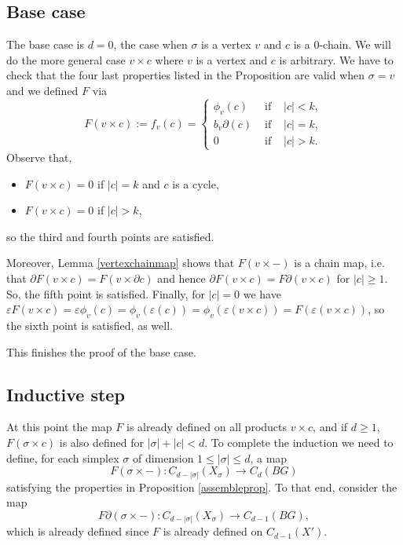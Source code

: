 \documentclass[11pt,letterpaper]{amsart}
\begin{document}
\subsection*{Base case}
The base case is $d=0$, the case when $\sigma$ is a vertex $v$ and $c$ is a $0$-chain. We will do the more general case $v\times c$ where $v$ is a vertex and $c$ is arbitrary. We have to check that the four last properties listed in the Proposition are valid when $\sigma=v$ and we defined $F$ via 
$$
F(v\times c):=f_v(c)=\left\{
\begin{array}{ccc}
\phi_v(c)&\mbox{ if }&|c|<k,\\
b_{v}\partial (c)&\mbox{ if }&|c|=k,\\
0&\mbox{ if }&|c|>k.
\end{array}\right.
$$
Observe that,
\begin{itemize}
\item
$F(v\times c)=0$ if $|c|=k$ and $c$ is a cycle, 
\item 
$F(v\times c)=0$ if $|c|>k$,
\end{itemize}
so the third and fourth points are satisfied. 

Moreover, Lemma \ref{vertexchainmap} shows that $F(v\times-)$ is a chain map, i.e. that $\partial F(v\times c)=F(v\times\partial c)$ and hence $\partial F(v\times c)=F\partial(v\times c)$ for $|c|\geq 1$. So, the fifth point is satisfied. Finally, for $|c|=0$ we have $\varepsilon F(v\times c)=\varepsilon\phi_v(c)=\phi_v(\varepsilon(c))=\phi_v(\varepsilon(v\times c))=F(\varepsilon(v\times c))$, so the sixth point is satisfied, as well.  

This finishes the proof of the base case. 

\subsection*{Inductive step}
At this point the map $F$ is already defined on all products $v\times c$, and if $d\geq 1$, $F(\sigma\times c)$ is also defined for $|\sigma|+|c|<d$.
To complete the induction we need to define, for each simplex $\sigma$ of dimension $1\leq|\sigma|\leq d$, a map 
$$
F(\sigma\times -):C_{d-|\sigma|}(X_{\sigma})\rightarrow C_{d}(BG)
$$ 
satisfying the properties in Proposition \ref{assembleprop}. To that end, consider the map $$
F\partial(\sigma\times-):C_{d-|\sigma|}(X_{\sigma})\rightarrow C_{d-1}(BG),
$$
which is already defined since $F$ is already defined on $C_{d-1}(X')$. %
\end{document}

